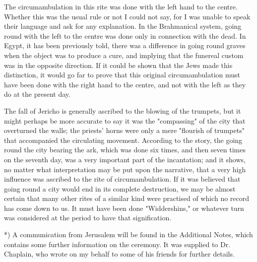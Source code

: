 \documentclass[a4paper, 11pt, oneside, polutonikogreek, english]{article}
\begin{document}
The circumambulation in this rite was done with the left hand to the centre. Whether this was the usual rule or not I could not say, for I was unable to speak their language and ask for any explanation. In the Brahmanical system, going round with the left to the centre was done only in connection with the dead. In Egypt, it has been previously told, there was a difference in going round graves when the object was to produce a cure, and implying that the funereal custom was in the opposite direction. If it could be shown that the Jews made this distinction, it would go far to prove that this original circumambulation must have been done with the right hand to the centre, and not with the left as they do at the present day.

The fall of Jericho is generally ascribed to the blowing of the trumpets, but it might perhaps be more accurate to say it was the "compassing" of the city that overturned the walls; the priests' horns were only a mere "flourish of trumpets" that accompanied the circulating movement. According to the story, the going round the city bearing the ark, which was done six times, and then seven times on the seventh day, was a very important part of the incantation; and it shows, no matter what interpretation may be put upon the narrative, that a very high influence was ascribed to the rite of circumambulation. If it was believed that going round a city would end in its complete destruction, we may be almost certain that many other rites of a similar kind were practised of which no record has come down to us. It must have been done "Widdershins," or whatever turn was considered at the period to have that signification.

*) A communication from Jerusalem will be found in the Additional Notes, which contains some further information on the ceremony. It was supplied to Dr. Chaplain, who wrote on my behalf to some of his friends for further details.
\end{document}
